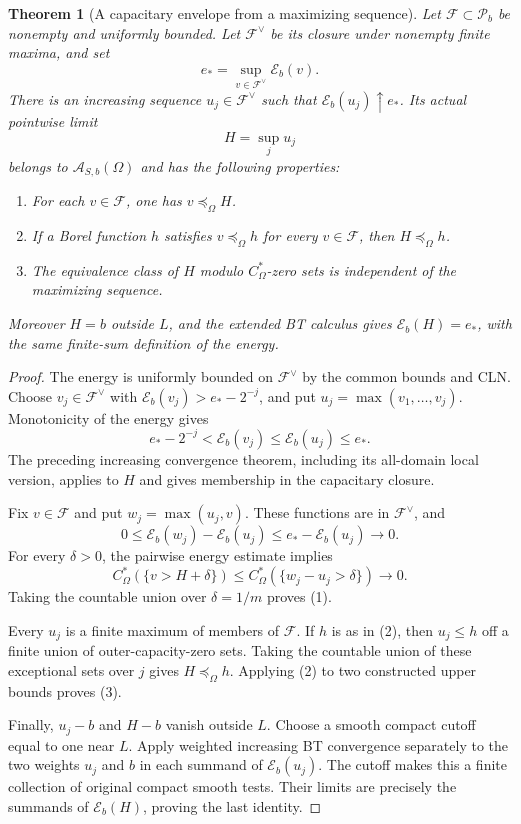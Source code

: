 \documentclass[11pt,a4paper]{article}
\numberwithin{equation}{section}
\newtheorem{theorem}{Theorem}[section]
\theoremstyle{definition}
\theoremstyle{remark}
\begin{document}
\begin{theorem}[A capacitary envelope from a maximizing sequence]
\label{thm:r2-one-domain-envelope}
Let $\mathcal F\subset\mathcal P_b$ be nonempty and uniformly
bounded. Let $\mathcal F^\vee$ be its closure under nonempty finite
maxima, and set
\[
 e_* = \sup_{v\in\mathcal F^\vee}\mathcal E_b(v).
\]
There is an increasing sequence $u_j\in\mathcal F^\vee$ such that
$\mathcal E_b(u_j)\uparrow e_*$. Its actual pointwise limit
\[
 H=\sup_j u_j
\]
belongs to $\mathcal A_{S,b}(\Omega)$ and has the following properties:
\begin{enumerate}
\item For each $v\in\mathcal F$, one has $v\preceq_\Omega H$.
\item If a Borel function $h$ satisfies $v\preceq_\Omega h$ for
      every $v\in\mathcal F$, then $H\preceq_\Omega h$.
\item The equivalence class of $H$ modulo $C_\Omega^*$-zero sets
      is independent of the maximizing sequence.
\end{enumerate}
Moreover $H=b$ outside $L$, and the extended BT calculus gives
$\mathcal E_b(H)=e_*$, with the same finite-sum definition of the
energy.
\end{theorem}

\begin{proof}
The energy is uniformly bounded on $\mathcal F^\vee$ by the
common bounds and CLN. Choose $v_j\in\mathcal F^\vee$ with
$\mathcal E_b(v_j)>e_*-2^{-j}$, and put
$u_j=\max(v_1,\ldots,v_j)$. Monotonicity of the energy gives
\[
 e_*-2^{-j}<\mathcal E_b(v_j)\leq\mathcal E_b(u_j)\leq e_*.
\]
The preceding increasing convergence theorem, including its
all-domain local version, applies to $H$ and gives membership in
the capacitary closure.

Fix $v\in\mathcal F$ and put $w_j=\max(u_j,v)$. These functions
are in $\mathcal F^\vee$, and
\[
 0\leq\mathcal E_b(w_j)-\mathcal E_b(u_j)
       \leq e_*-\mathcal E_b(u_j)\longrightarrow0.
\]
For every $\delta>0$, the pairwise energy estimate implies
\[
 C_\Omega^*(\{v>H+\delta\})
 \leq C_\Omega^*(\{w_j-u_j>\delta\})\longrightarrow0.
\]
Taking the countable union over $\delta=1/m$ proves (1).

Every $u_j$ is a finite maximum of members of $\mathcal F$.
If $h$ is as in (2), then $u_j\leq h$ off a finite union of
outer-capacity-zero sets. Taking the countable union of these
exceptional sets over $j$ gives $H\preceq_\Omega h$.
Applying (2) to two constructed upper bounds proves (3).

Finally, $u_j-b$ and $H-b$ vanish outside $L$. Choose a smooth
compact cutoff equal to one near $L$. Apply weighted increasing
BT convergence separately to the two weights $u_j$ and $b$ in
each summand of $\mathcal E_b(u_j)$. The cutoff makes this a
finite collection of original compact smooth tests. Their limits
are precisely the summands of $\mathcal E_b(H)$, proving the
last identity.
\end{proof}
\end{document}
